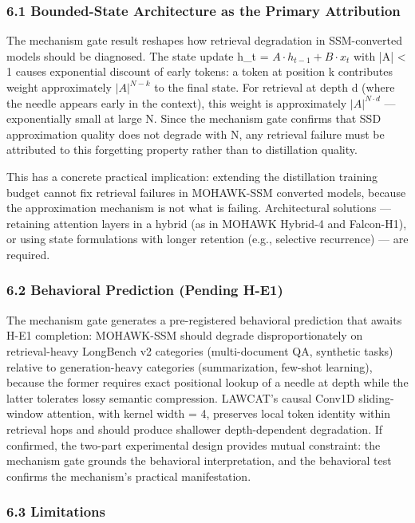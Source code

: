 
\subsubsection{6.1 Bounded-State Architecture as the Primary Attribution}

The mechanism gate result reshapes how retrieval degradation in SSM-converted models should be diagnosed. The state update h\_t = $A\cdot h_{t-1} + B\cdot x_t$ with |A| < 1 causes exponential discount of early tokens: a token at position k contributes weight approximately $|A|^{N-k}$ to the final state. For retrieval at depth d (where the needle appears early in the context), this weight is approximately $|A|^{N\cdot d}$ --- exponentially small at large N. Since the mechanism gate confirms that SSD approximation quality does not degrade with N, any retrieval failure must be attributed to this forgetting property rather than to distillation quality.

This has a concrete practical implication: extending the distillation training budget cannot fix retrieval failures in MOHAWK-SSM converted models, because the approximation mechanism is not what is failing. Architectural solutions --- retaining attention layers in a hybrid (as in MOHAWK Hybrid-4 and Falcon-H1), or using state formulations with longer retention (e.g., selective recurrence) --- are required.

\subsubsection{6.2 Behavioral Prediction (Pending H-E1)}

The mechanism gate generates a pre-registered behavioral prediction that awaits H-E1 completion: MOHAWK-SSM should degrade disproportionately on retrieval-heavy LongBench v2 categories (multi-document QA, synthetic tasks) relative to generation-heavy categories (summarization, few-shot learning), because the former requires exact positional lookup of a needle at depth while the latter tolerates lossy semantic compression. LAWCAT's causal Conv1D sliding-window attention, with kernel width = 4, preserves local token identity within retrieval hops and should produce shallower depth-dependent degradation. If confirmed, the two-part experimental design provides mutual constraint: the mechanism gate grounds the behavioral interpretation, and the behavioral test confirms the mechanism's practical manifestation.

\subsubsection{6.3 Limitations}

